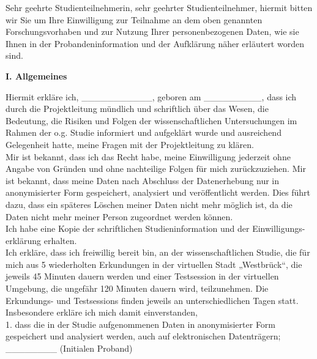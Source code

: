 Sehr geehrte Studienteilnehmerin, sehr geehrter Studienteilnehmer,
hiermit bitten wir Sie um Ihre Einwilligung zur Teilnahme an dem oben genannten Forschungsvorhaben und zur Nutzung Ihrer personenbezogenen Daten, wie sie Ihnen in der Probandeninformation und der Aufklärung näher erläutert worden sind. \\

\begin{center}
	\large{\textbf{I. Allgemeines}} \\
\end{center}

Hiermit erkläre ich, \_\_\_\_\_\_\_\_\_\_\_, geboren am \_\_\_\_\_\_\_\_\_, dass ich durch die Projektleitung mündlich und schriftlich über das Wesen, die Bedeutung, die Risiken und Folgen der wissenschaftlichen Untersuchungen im Rahmen der o.g. Studie informiert und aufgeklärt wurde und ausreichend Gelegenheit hatte, meine Fragen mit der Projektleitung zu klären. \\

Mir ist bekannt, dass ich das Recht habe, meine Einwilligung jederzeit ohne Angabe von Gründen und ohne nachteilige Folgen für mich zurückzuziehen. Mir ist bekannt, dass meine Daten nach Abschluss der Datenerhebung nur in anonymisierter Form gespeichert, analysiert und veröffentlicht werden. Dies führt dazu, dass ein späteres Löschen meiner Daten nicht mehr möglich ist, da die Daten nicht mehr meiner Person zugeordnet werden können. \\

Ich habe eine Kopie der schriftlichen Studieninformation und der Einwilligungs-erklärung erhalten. \\

Ich erkläre, dass ich freiwillig bereit bin, an der wissenschaftlichen Studie, die für mich aus 5 wiederholten Erkundungen in der virtuellen Stadt „Westbrück“, die jeweils 45 Minuten dauern werden und einer Testsession in der virtuellen Umgebung, die ungefähr 120 Minuten dauern wird, teilzunehmen. Die Erkundungs- und Testsessions finden jeweils an unterschiedlichen Tagen statt. \\

Insbesondere erkläre ich mich damit einverstanden, \\

1.     dass die in der Studie aufgenommenen Daten in anonymisierter Form gespeichert und analysiert werden, auch auf elektronischen Datenträgern; \\
\_\_\_\_\_\_\_\_ (Initialen Proband) \\

